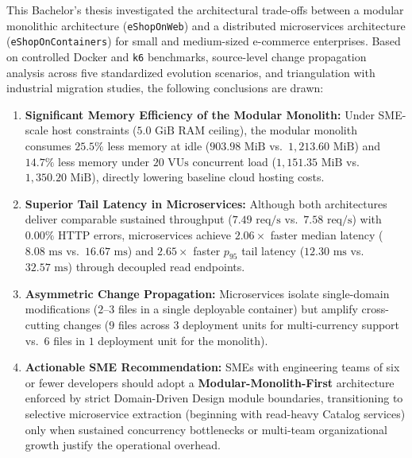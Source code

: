 
This Bachelor's thesis investigated the architectural trade-offs between a modular monolithic architecture (\texttt{eShopOnWeb}) and a distributed microservices architecture (\texttt{eShopOnContainers}) for small and medium-sized e-commerce enterprises. Based on controlled Docker and \texttt{k6} benchmarks, source-level change propagation analysis across five standardized evolution scenarios, and triangulation with industrial migration studies, the following conclusions are drawn:

\begin{enumerate}[leftmargin=1.5em]
  \item \textbf{Significant Memory Efficiency of the Modular Monolith:} Under SME-scale host constraints ($5.0\text{ GiB}$ RAM ceiling), the modular monolith consumes $25.5\%$ less memory at idle ($903.98\text{ MiB}$ vs.\ $1,213.60\text{ MiB}$) and $14.7\%$ less memory under $20\text{ VUs}$ concurrent load ($1,151.35\text{ MiB}$ vs.\ $1,350.20\text{ MiB}$), directly lowering baseline cloud hosting costs.
  \item \textbf{Superior Tail Latency in Microservices:} Although both architectures deliver comparable sustained throughput ($7.49\text{ req/s}$ vs.\ $7.58\text{ req/s}$) with $0.00\%$ HTTP errors, microservices achieve $2.06\times$ faster median latency ($8.08\text{ ms}$ vs.\ $16.67\text{ ms}$) and $2.65\times$ faster $p_{95}$ tail latency ($12.30\text{ ms}$ vs.\ $32.57\text{ ms}$) through decoupled read endpoints.
  \item \textbf{Asymmetric Change Propagation:} Microservices isolate single-domain modifications ($2$--$3$ files in a single deployable container) but amplify cross-cutting changes ($9$ files across $3$ deployment units for multi-currency support vs.\ $6$ files in $1$ deployment unit for the monolith).
  \item \textbf{Actionable SME Recommendation:} SMEs with engineering teams of six or fewer developers should adopt a \textbf{Modular-Monolith-First} architecture enforced by strict Domain-Driven Design module boundaries, transitioning to selective microservice extraction (beginning with read-heavy Catalog services) only when sustained concurrency bottlenecks or multi-team organizational growth justify the operational overhead.
\end{enumerate}
